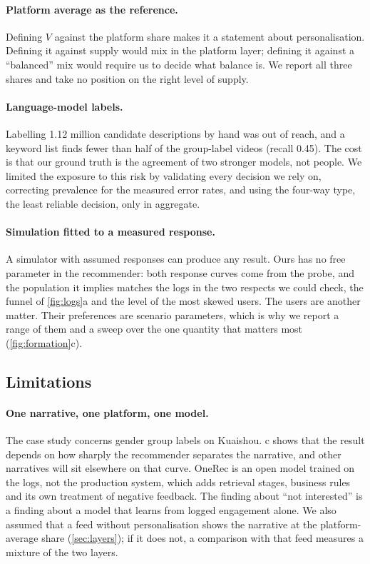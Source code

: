 \paragraph{Platform average as the reference.} Defining $V$ against the platform share makes it a statement about personalisation. Defining it against supply would mix in the platform layer; defining it against a ``balanced'' mix would require us to decide what balance is. We report all three shares and take no position on the right level of supply.

\paragraph{Language-model labels.} Labelling 1.12 million candidate descriptions by hand was out of reach, and a keyword list finds fewer than half of the group-label videos (recall 0.45). The cost is that our ground truth is the agreement of two stronger models, not people. We limited the exposure to this risk by validating every decision we rely on, correcting prevalence for the measured error rates, and using the four-way type, the least reliable decision, only in aggregate.

\paragraph{Simulation fitted to a measured response.} A simulator with assumed responses can produce any result. Ours has no free parameter in the recommender: both response curves come from the probe, and the population it implies matches the logs in the two respects we could check, the funnel of \cref{fig:logs}a and the level of the most skewed users. The users are another matter. Their preferences are scenario parameters, which is why we report a range of them and a sweep over the one quantity that matters most (\cref{fig:formation}c).

\subsection{Limitations}

\paragraph{One narrative, one platform, one model.} The case study concerns gender group labels on Kuaishou. c shows that the result depends on how sharply the recommender separates the narrative, and other narratives will sit elsewhere on that curve. OneRec is an open model trained on the logs, not the production system, which adds retrieval stages, business rules and its own treatment of negative feedback. The finding about ``not interested'' is a finding about a model that learns from logged engagement alone. We also assumed that a feed without personalisation shows the narrative at the platform-average share (\cref{sec:layers}); if it does not, a comparison with that feed measures a mixture of the two layers.

